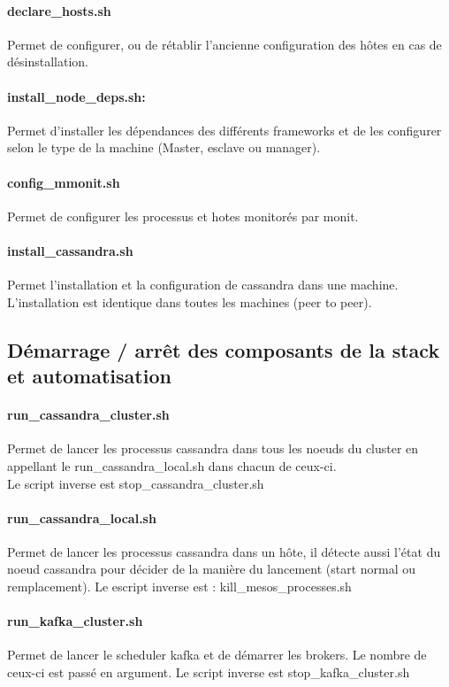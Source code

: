 \documentclass[a4paper, 11pt, titlepage]{article}
\begin{document}
\paragraph{declare\_hosts.sh}
Permet de configurer, ou de rétablir l'ancienne configuration des hôtes en cas de désinstallation.

\paragraph{install\_node\_deps.sh:}
Permet d'installer les dépendances des différents frameworks et de les configurer selon le type de la machine (Master, esclave ou manager).

\paragraph{config\_mmonit.sh}
Permet de configurer les processus et hotes monitorés par monit.

\paragraph{install\_cassandra.sh}
Permet l'installation et la configuration de cassandra dans une machine. L’installation est identique dans toutes les machines (peer to peer).


\subsection{Démarrage / arrêt des composants de la stack et automatisation}
\paragraph{run\_cassandra\_cluster.sh}
Permet de lancer les processus cassandra dans tous les noeuds du cluster en appellant le run\_cassandra\_local.sh dans chacun de ceux-ci. \\Le script inverse est stop\_cassandra\_cluster.sh

\paragraph{run\_cassandra\_local.sh}
Permet de lancer les processus cassandra dans un hôte, il détecte aussi l’état du noeud cassandra pour décider de la manière du lancement (start normal ou remplacement). Le escript inverse est : kill\_mesos\_processes.sh

\paragraph{run\_kafka\_cluster.sh}
Permet de lancer le scheduler kafka et de démarrer les brokers. Le nombre de ceux-ci est passé en argument. Le script inverse est stop\_kafka\_cluster.sh
\end{document}
